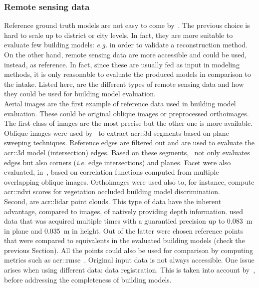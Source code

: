         \subsubsection{Remote sensing data}
            Reference ground truth models are not easy to come by~\parencite{schuster2003new}.
            The previous choice is hard to scale up to district or city levels.
            In fact, they are more suitable to evaluate few building models: \textit{e.g.} in order to validate a reconstruction method.
            On the other hand, remote sensing data are more accessible and could be used, instead, as reference.
            In fact, since these are usually fed as input in modeling methods, it is only reasonable to evaluate the produced models in comparison to the intake.
            Listed here, are the different types of remote sensing data and how they could be used for building model evaluation.\\

            Aerial images are the first example of reference data used in building model evaluation.
            These could be original oblique images or preprocessed orthoimages.
            The first class of images are the most precise but the other one is more available.
            Oblique images were used by~\textcite{michelin2013quality} to extract \gls{acr::3d} segments based on plane sweeping techniques.
            Reference edges are filtered out and are used to evaluate the \gls{acr::3d} model (intersection) edges.
            Based on these segments,~\textcite{boudet2006supervised} not only evaluates edges but also corners (\textit{i.e.} edge intersections) and planes.
            Facet were also evaluated, in~\parencite{boudet2006supervised}, based on correlation functions computed from multiple overlapping oblique images.
            Orthoimages were used also to, for instance, compute \gls{acr::ndvi} scores for vegetation occluded building model discrimination.\\

            Second, are \gls{acr::lidar} point clouds.
            This type of data have the inherent advantage, compared to images, of natively providing depth information.
            \textcite{kaartinen2005accuracy} used data that was acquired multiple times with a guarantied precision up to \SI{0.083}{\m} in plane and \SI{0.035}{\m} in height.
            Out of the latter were chosen reference points that were compared to equivalents in the evaluated building models (check the previous Section).
            All the points could also be used for comparison by computing metrics such as \gls{acr::rmse}~\parencite{lafarge2012creating,zhu2018large}.
            Original input data is not always accessible.
            One issue arises when using different data: data registration.
            This is taken into account by~\textcite{akca2010quality}, before addressing the completeness of building models.\\
            
